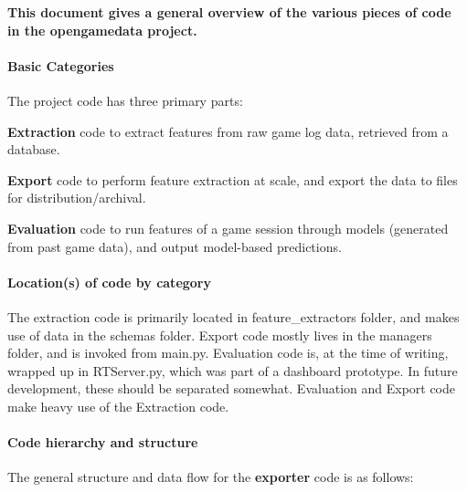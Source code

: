 {\bfseries{This document gives a general overview of the various pieces of code in the opengamedata project.}}

\paragraph*{Basic Categories}

The project code has three primary parts\+:
\begin{DoxyEnumerate}
\item {\bfseries{Extraction}} code to extract features from raw game log data, retrieved from a database.
\item {\bfseries{Export}} code to perform feature extraction at scale, and export the data to files for distribution/archival.
\item {\bfseries{Evaluation}} code to run features of a game session through models (generated from past game data), and output model-\/based predictions.
\end{DoxyEnumerate}

\paragraph*{Location(s) of code by category}

The extraction code is primarily located in feature\+\_\+extractors folder, and makes use of data in the schemas folder. Export code mostly lives in the managers folder, and is invoked from main.\+py. Evaluation code is, at the time of writing, wrapped up in R\+T\+Server.\+py, which was part of a dashboard prototype. In future development, these should be separated somewhat. Evaluation and Export code make heavy use of the Extraction code.

\paragraph*{Code hierarchy and structure}

The general structure and data flow for the {\bfseries{exporter}} code is as follows\+:


